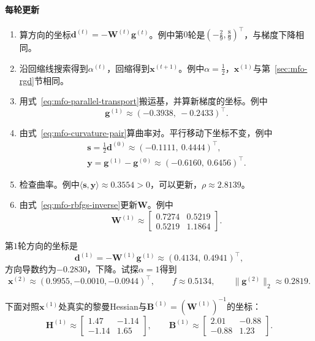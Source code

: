 \paragraph{每轮更新}
\begin{enumerate}
 \item 算方向的坐标$\bm{d}^{(t)}=-\bm{W}^{(t)}\bm{g}^{(t)}$。例中第$0$轮是$(-\tfrac29,\tfrac89)^\top$，与梯度下降相同。

 \item 沿回缩线搜索得到$\alpha^{(t)}$，回缩得到$\bm{x}^{(t+1)}$。例中$\alpha=\tfrac12$，$\bm{x}^{(1)}$与第~\ref{sec:mfo-rgd}节相同。

 \item 用式~\eqref{eq:mfo-parallel-transport}搬运基，并算新梯度的坐标。例中
 \[
  \bm{g}^{(1)}\approx(-0.3938,\ -0.2433)^\top.
 \]

 \item 由式~\eqref{eq:mfo-curvature-pair}算曲率对。平行移动下坐标不变，例中
 \[
  \begin{gathered}
  \bm{s}=\frac12\bm{d}^{(0)}\approx(-0.1111,\ 0.4444)^\top,\\
  \bm{y}=\bm{g}^{(1)}-\bm{g}^{(0)}\approx(-0.6160,\ 0.6456)^\top.
  \end{gathered}
 \]

 \item 检查曲率。例中$\langle\bm{s},\bm{y}\rangle\approx0.3554>0$，可以更新，$\rho\approx2.8139$。

 \item 由式~\eqref{eq:mfo-rbfgs-inverse}更新$\bm{W}$。例中
 \[
  \bm{W}^{(1)}\approx\begin{bmatrix}0.7274&0.5219\\0.5219&1.1864\end{bmatrix}.
 \]
\end{enumerate}

第$1$轮方向的坐标是
\[
 \bm{d}^{(1)}=-\bm{W}^{(1)}\bm{g}^{(1)}\approx(0.4134,\ 0.4941)^\top,
\]
方向导数约为$-0.2830$，下降。试探$\alpha=1$得到
\[
 \bm{x}^{(2)}\approx(0.9955,-0.0010,-0.0944)^\top,\qquad f\approx0.5134,\qquad\lVert\bm{g}^{(2)}\rVert_2\approx0.2819.
\]

下面对照$\bm{x}^{(1)}$处真实的黎曼Hessian与$\bm{B}^{(1)}=(\bm{W}^{(1)})^{-1}$的坐标：
\[
 \bm{H}^{(1)}\approx\begin{bmatrix}1.47&-1.14\\-1.14&1.65\end{bmatrix},\qquad
 \bm{B}^{(1)}\approx\begin{bmatrix}2.01&-0.88\\-0.88&1.23\end{bmatrix}.
\]


